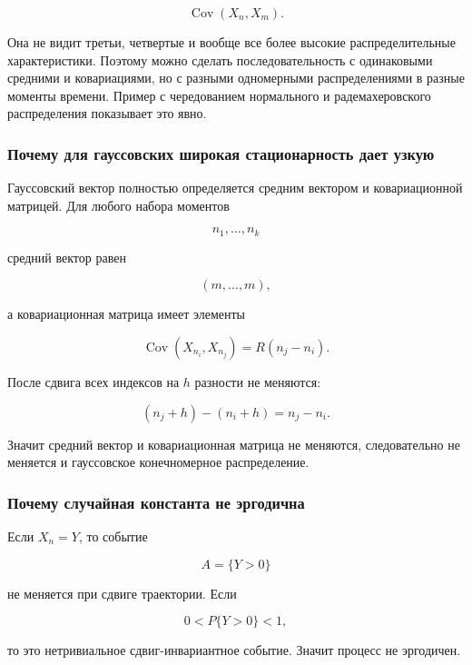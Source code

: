 \documentclass[
  11pt,
  a4paper,
]{article}
\begin{document}
\[
\operatorname{Cov}(X_n,X_m).
\]

Она не видит третьи, четвертые и вообще все более высокие
распределительные характеристики. Поэтому можно сделать
последовательность с одинаковыми средними и ковариациями, но с разными
одномерными распределениями в разные моменты времени. Пример с
чередованием нормального и радемахеровского распределения показывает это
явно.

\subsubsection{Почему для гауссовских широкая стационарность дает
узкую}\label{ux43fux43eux447ux435ux43cux443-ux434ux43bux44f-ux433ux430ux443ux441ux441ux43eux432ux441ux43aux438ux445-ux448ux438ux440ux43eux43aux430ux44f-ux441ux442ux430ux446ux438ux43eux43dux430ux440ux43dux43eux441ux442ux44c-ux434ux430ux435ux442-ux443ux437ux43aux443ux44e}

Гауссовский вектор полностью определяется средним вектором и
ковариационной матрицей. Для любого набора моментов

\[
n_1,\ldots,n_k
\]

средний вектор равен

\[
(m,\ldots,m),
\]

а ковариационная матрица имеет элементы

\[
\operatorname{Cov}(X_{n_i},X_{n_j})
=
R(n_j-n_i).
\]

После сдвига всех индексов на \(h\) разности не меняются:

\[
(n_j+h)-(n_i+h)=n_j-n_i.
\]

Значит средний вектор и ковариационная матрица не меняются,
следовательно не меняется и гауссовское конечномерное распределение.

\subsubsection{Почему случайная константа не
эргодична}\label{ux43fux43eux447ux435ux43cux443-ux441ux43bux443ux447ux430ux439ux43dux430ux44f-ux43aux43eux43dux441ux442ux430ux43dux442ux430-ux43dux435-ux44dux440ux433ux43eux434ux438ux447ux43dux430}

Если \(X_n=Y\), то событие

\[
A=\{Y>0\}
\]

не меняется при сдвиге траектории. Если

\[
0<P\{Y>0\}<1,
\]

то это нетривиальное сдвиг-инвариантное событие. Значит процесс не
эргодичен.
\end{document}
